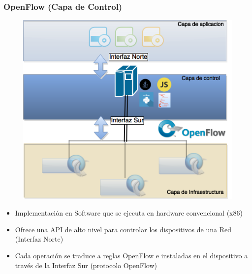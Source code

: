 \documentclass{beamer}
\begin{document}
\begin{frame}
\frametitle{OpenFlow (Capa de Control)} 
\begin{minipage}{0.40\textwidth}
	\begin{figure}[H]
		\centering
		\includegraphics[width=1.0\textwidth]{imagenes/openflowController.png}
	\end{figure}
\end{minipage}
\hfill
\begin{minipage}{0.58\textwidth}
\begin{itemize}
\item Implementaci\'on en Software que se ejecuta en hardware convencional (x86)
\item Ofrece una API de alto nivel para controlar los dispositivos de una Red (Interfaz Norte)
\item Cada operaci\'on se traduce a reglas OpenFlow e instaladas en el dispositivo a trav\'es de la Interfaz Sur (protocolo OpenFlow)
\end{itemize}

\end{minipage}
\end{frame}
\end{document}
